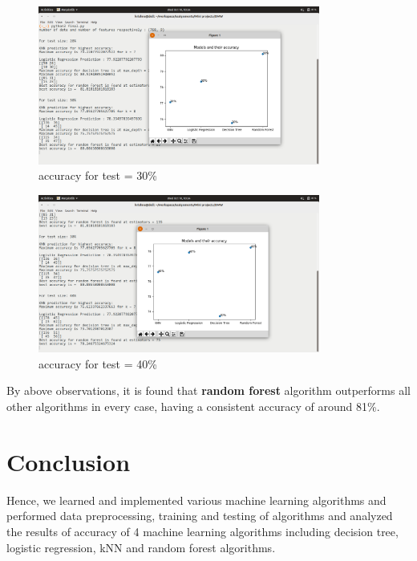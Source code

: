 \documentclass{article}
\begin{document}
\begin{figure}
	\centering
	\includegraphics[width=350px]{output_30.png}
	\caption{accuracy for test = 30\%}
\end{figure}

\begin{figure}
	\centering
	\includegraphics[width=350px]{output_40.png}
	\caption{accuracy for test = 40\%}
\end{figure}
\newpage
By above observations, it is found that \textbf{random forest} algorithm outperforms all other algorithms in every case, having a consistent accuracy of around 81\%.
\section{Conclusion}
\par Hence, we learned and implemented various machine learning algorithms and performed data preprocessing, training and testing of algorithms and analyzed the results of accuracy of 4 machine learning algorithms including decision tree, logistic regression, kNN and random forest algorithms.
\end{document}
